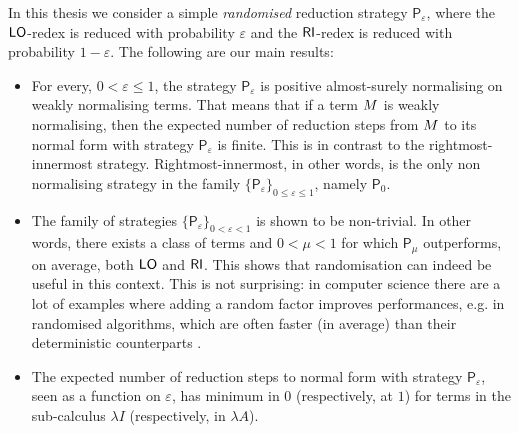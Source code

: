 In this thesis we consider a simple \emph{randomised}
reduction strategy $\mathsf{P}_\varepsilon$, where the $\textsf{LO}$-redex
is reduced with probability $\varepsilon$ and the $\textsf{RI}$-redex is
reduced with probability $1-\varepsilon$. The following are our main results:
\begin{itemize}
	\item
	For every, $0<\varepsilon\leq 1$, the strategy
	$\mathsf{P}_\varepsilon$ is positive almost-surely normalising on
	weakly normalising terms. That means that if a term $M$ is
	weakly normalising, then the expected number of reduction steps from
	$M$ to its normal form with strategy $\mathsf{P}_\varepsilon$
	is finite. This is in contrast to the rightmost-innermost strategy. Rightmost-innermost, in other
	words, is the only non normalising strategy in the family
	$\{\mathsf{P}_\varepsilon\}_{0\leq\varepsilon\leq 1}$, namely $\mathsf{P}_0$.
	\item
	The family of strategies
	$\{\mathsf{P}_\varepsilon\}_{0<\varepsilon<1}$ is shown to be
	non-trivial. In other words, there exists a class of terms and
	$0<\mu<1$ for which $\mathsf{P}_\mu$ outperforms, on average, both
	$\textsf{LO}$ and $\textsf{RI}$. This shows that randomisation can
	indeed be useful in this context. This is not surprising:
	in computer science there are a lot of examples where adding a random factor
	improves performances, e.g. in randomised algorithms, which are
	often faster (in average) than their deterministic counterparts
	\cite{motwani_randomized_1995}.
	\item
	The expected number of reduction steps to
	normal form with strategy $\mathsf{P}_\varepsilon$, seen as a function
	on $\varepsilon$, has minimum in $0$ (respectively, at $1$) for terms
	in the sub-calculus $\lambda I$ (respectively, in $\lambda A$).
\end{itemize}

\pagebreak

